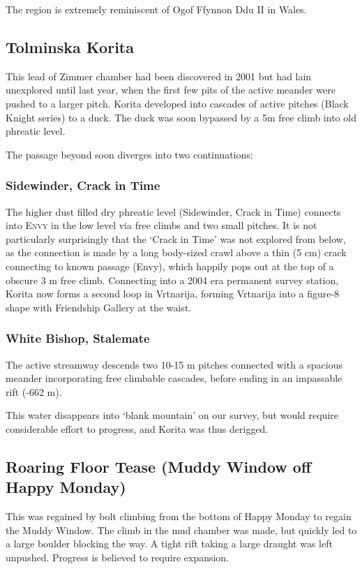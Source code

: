 \documentclass[english,a4]{article}
\begin{document}
The region is extremely reminiscent of Ogof Ffynnon Ddu II in Wales.


\subsection{Tolminska Korita}

This lead of Zimmer chamber had been discovered in 2001 but had lain
unexplored until last year, when the first few pits of the active
meander were pushed to a larger pitch. Korita developed into cascades
of active pitches (Black Knight series) to a duck. The duck was soon
bypassed by a 5m free climb into old phreatic level. 

The passage beyond
soon diverges into two continuations:

\subsubsection{Sidewinder, Crack in Time}

The higher dust filled dry phreatic level (Sidewinder, Crack in Time) connects
into \textsc{Envy} in the low level via free climbs and two small pitches. It
is not particularly surprisingly that the `Crack in Time' was not explored from
below, as the connection is made by a long body-sized crawl above a thin (5 cm)
crack connecting to known passage (Envy), which happily pops out at the top of
a obscure 3 m free climb. Connecting into a 2004 era permanent survey station,
Korita now forms a second loop in Vrtnarija, forming Vrtnarija into a figure-8
shape with Friendship Gallery at the waist.

\subsubsection{White Bishop, Stalemate}

The active streamway descends 
two 10-15 m pitches connected with a spacious meander incorporating free
climbable cascades, before ending in an impassable rift (-662 m). 

This water disappears into `blank mountain' on
our survey, but would require considerable effort to progress, and Korita
was thus derigged.

\subsection{Roaring Floor Tease (Muddy Window off Happy Monday)}

This was regained by bolt climbing from the bottom of Happy Monday to regain the Muddy Window. 
The climb in the mud chamber was made, but quickly led to a large boulder
blocking the way. A tight rift taking a large draught was left unpushed.
Progress is believed to require expansion.
\end{document}
